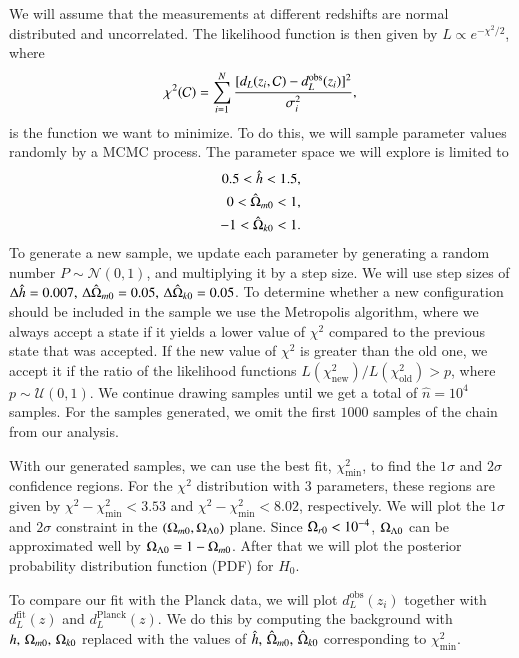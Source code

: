 We will assume that the measurements at different redshifts are normal distributed and uncorrelated. The likelihood function is then given by $L\propto e^{-\chi^2/2}$, where 
\begin{equation}
    \chi^2(\mathcal{C}) = \sum_{i=1}^N \frac{[d_L(z_i, \mathcal{C}) - d_L^\mathrm{obs}(z_i)]^2}{\sigma_i^2}, \label{eq:M1:implementations:chi2_supernova_data}
\end{equation}
is the function we want to minimize.  To do this, we will sample parameter values randomly by a MCMC process. The parameter space we will explore is limited to  
\begin{equation} \label{eq:M1:implementations:supernova_parameter_ranges}
    \begin{split}
        0.5 < \hat{h} < 1.5, \\
        0 < \hat{\Omega}_{m0} < 1, \\
        -1 < \hat{\Omega}_{k0} < 1.
    \end{split}
\end{equation}   
To generate a new sample, we update each parameter by generating a random number $P\sim\mathcal{N}(0,1)$, and multiplying it by a step size. We will use step sizes of $\Delta \hat{h} = 0.007,\,\Delta \hat{\Omega}_{m0}=0.05,\,\Delta\hat{\Omega}_{k0}=0.05$. To determine whether a new configuration should be included in the sample we use the Metropolis algorithm, where we always accept a state if it yields a lower value of $\chi^2$ compared to the previous state that was accepted. If the new value of $\chi^2$ is greater than the old one, we accept it if the ratio of the likelihood functions $L(\chi^2_\mathrm{new})/L(\chi^2_\mathrm{old})>p$, where $p\sim\mathcal{U}(0,1)$. We continue drawing samples until we get a total of $\hat{n}=10^4$ samples. For the samples generated, we omit the first $1000$ samples of the chain from our analysis.   

With our generated samples, we can use the best fit, $\chi^2_\mathrm{min}$, to find the $1\sigma$ and $2\sigma$ confidence regions. For the $\chi^2$ distribution with $3$ parameters, these regions are given by $\chi^2 - \chi^2_\mathrm{min}<3.53$ and $\chi^2 - \chi^2_\mathrm{min}<8.02$, respectively. We will plot the $1\sigma$ and $2\sigma$ constraint in the $(\Omega_{m0},\Omega_{\Lambda 0})$ plane. Since $\Omega_{r0}<10^{-4}$, $\Omega_{\Lambda 0}$ can be approximated well by $\Omega_{\Lambda 0}=1-\Omega_{m0}$. After that we will plot the posterior probability distribution function (PDF) for $H_0$. 

To compare our fit with the Planck data, we will plot $d_L^\mathrm{obs}(z_i)$ together with $d_L^\mathrm{fit}(z)$ and $d_L^\mathrm{Planck}(z)$. We do this by computing the background with $h,\,\Omega_{m0},\,\Omega_{k0}$ replaced with the values of $\hat{h},\,\hat{\Omega}_{m0},\,\hat{\Omega}_{k0}$ corresponding to $\chi^2_\mathrm{min}$.     



